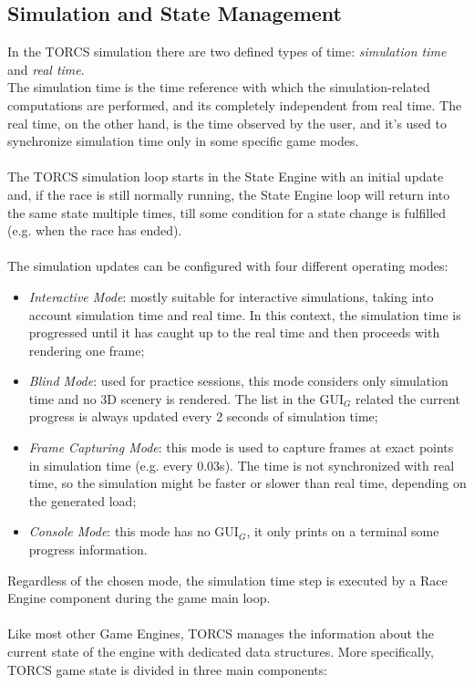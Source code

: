\subsection{Simulation and State Management}\label{torcs-state-management}
In the TORCS simulation there are two defined types of time: \textit{simulation time} and \textit{real time}. \\
The simulation time is the time reference with which the simulation-related computations are performed, and its completely independent from real time. The real time, on the other hand, is the time observed by the user, and it's used to synchronize simulation time only in some specific game modes. \\ \\
The TORCS simulation loop starts in the State Engine with an initial update and, if the race is still normally running, the State Engine loop will return into the same state multiple times, till some condition for a state change is fulfilled (e.g. when the race has ended). \\ \\
The simulation updates can be configured with four different operating modes:
\begin{itemize}
	\item \textit{Interactive Mode}: mostly suitable for interactive simulations, taking into account simulation time and real time. In this context, the simulation time is progressed until it has caught up to the real time and then proceeds with rendering one frame;
	\item \textit{Blind Mode}: used for practice sessions, this mode considers only simulation time and no 3D scenery is rendered. The list in the GUI$_G$ related the current progress is always updated every 2 seconds of simulation time;
	\item \textit{Frame Capturing Mode}: this mode is used to capture frames at exact points in simulation time (e.g. every 0.03s). The time is not synchronized with real time, so the simulation might be faster or slower than real time, depending on the generated load;
	\item \textit{Console Mode}: this mode has no GUI$_G$, it only prints on a terminal some progress information.
\end{itemize}
Regardless of the chosen mode, the simulation time step is executed by a Race Engine component during the game main loop. \\ \\
Like most other Game Engines, TORCS manages the information about the current state of the engine with dedicated data structures. More specifically, TORCS game state is divided in three main components:
